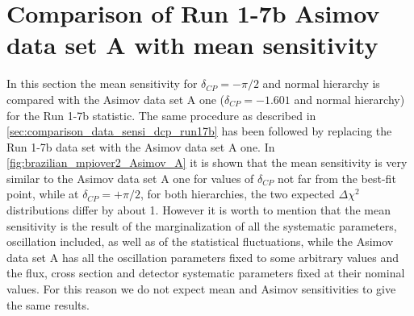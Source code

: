 
%
%


\section {Comparison of Run 1-7b Asimov data set A with mean sensitivity}
\label{app:brazilian_asimov_mean_dcp_run17b}


In this section the mean sensitivity for $\delta_{CP} = -\pi /2$ and normal hierarchy
is compared with the Asimov data set A one ($\delta_{CP} = -1.601$ and normal hierarchy) 
for the Run 1-7b statistic.
The same procedure as described in \cref{sec:comparison_data_sensi_dcp_run17b} has been followed
by replacing the Run 1-7b data set with the Asimov data set A one.
In \cref{fig:brazilian_mpiover2_Asimov_A} it is shown that the mean sensitivity is very 
similar to the Asimov data set A one 
for values of $\delta_{CP}$ not far from the best-fit point,
while at $\delta_{CP} = +\pi/2$, for both hierarchies, the two expected 
$\Delta \chi^2$ distributions differ by about 1.
However it is worth to mention that the mean sensitivity is the result of the marginalization
of all the systematic parameters, oscillation included,
as well as of the statistical fluctuations,
while the Asimov data set A has 
all the oscillation parameters fixed to some arbitrary values
and the flux, cross section and detector systematic parameters fixed at their nominal values.
For this reason we do not expect mean and Asimov sensitivities to 
give the same results.

